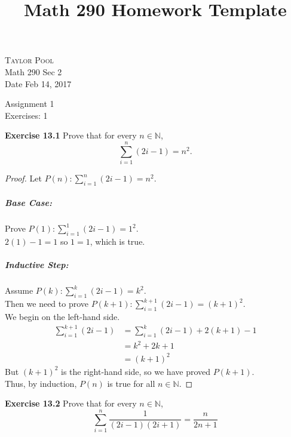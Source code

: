 \documentclass[12pt,oneside]{article}
\newenvironment{exercise}[1]{\vspace{.1in}\noindent\textbf{Exercise #1 \hspace{.05em}}}{}
\newcommand{\N}{\mathbb{N}}
\begin{document}
\title{Math 290 Homework Template}

\begin{flushright}
\textsc{Taylor Pool}  \\
Math 290 Sec 2\\
Date Feb 14, 2017
\end{flushright}

\begin{center}
\textsf{Assignment 1} \\
\textsf{Exercises: 1}
\end{center}


\begin{exercise}{13.1}
Prove that for every $n \in \N$,
\\
\begin{equation*}
\sum_{i=1}^n (2i-1) = n^2.
\end{equation*}
\end{exercise}

\begin{proof}
Let $P(n): \sum_{i=1}^n (2i-1) = n^2$.
\subparagraph*{Base Case:}
Prove $P(1): \sum_{i=1}^1 (2i-1) = 1^2$.\\
$2(1)-1=1$ so
$1=1$, which is true.

\subparagraph*{Inductive Step:}
Assume $P(k): \sum_{i=1}^k (2i-1) = k^2$.\\
Then we need to prove $P(k+1):\sum_{i=1}^{k+1} (2i-1) = (k+1)^2$.\\
We begin on the left-hand side.\\
\begin{align*}
\sum_{i=1}^{k+1} (2i-1) &= \sum_{i=1}^k (2i-1) + 2(k+1)-1 \\
&= k^2+2k+1 \\
&= (k+1)^2
\end{align*}
But $(k+1)^2$ is the right-hand side, so we have proved $P(k+1)$.\\
Thus, by induction, $P(n)$ is true for all $n \in \N$.
\end{proof}

\begin{exercise}{13.2}
Prove that for every $n \in \N$,
\begin{equation*}
\sum_{i=1}^n \frac{1}{(2i-1)(2i+1)} = \frac{n}{2n+1}
\end{equation*}
\end{exercise}
\end{document}
